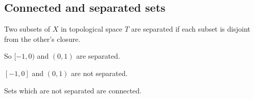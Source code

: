 
\subsection{Connected and separated sets}

Two subsets of \(X\) in topological space \(T\) are separated if each subset is disjoint from the other's closure.

So \([-1,0)\) and \((0,1)\) are separated.

\([-1,0]\) and \((0,1)\) are not separated.

Sets which are not separated are connected.

